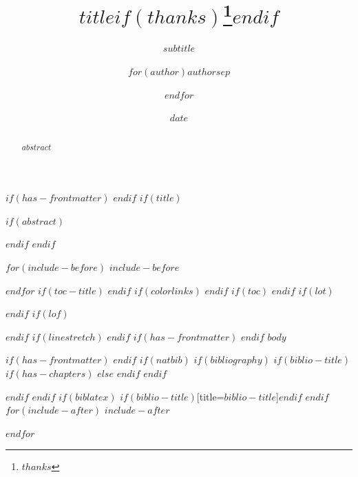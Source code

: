 \documentclass[
a4paper,
]{$documentclass$}
\title{$title$$if(thanks)$\thanks{$thanks$}$endif$}
\subtitle{$subtitle$}
\author{$for(author)$$author$$sep$ \and $endfor$}
\date{$date$}
\begin{document}
$if(has-frontmatter)$
\frontmatter
$endif$
$if(title)$
\maketitle
$if(abstract)$
\begin{abstract}
$abstract$
\end{abstract}
$endif$
$endif$
\layout

$for(include-before)$
$include-before$

$endfor$
$if(toc-title)$
\renewcommand*\contentsname{%
    $toc-title$%
    $if(toc-subtitle)$
    \newline\textmd{\small{$toc-subtitle$}}%
    $endif$%
}
$endif$
$if(colorlinks)$
\hypersetup{linkcolor=$if(toccolor)$$toccolor$$else$$endif$}
$endif$
$if(toc)$
{
\setcounter{tocdepth}{$toc-depth$}
\tableofcontents
}
$endif$
$if(lot)$
\listoftables
$endif$
$if(lof)$
\listoffigures
$endif$
$if(linestretch)$
$endif$
$if(has-frontmatter)$
\mainmatter
$endif$
$body$

$if(has-frontmatter)$
\backmatter
$endif$
$if(natbib)$
$if(bibliography)$
$if(biblio-title)$
$if(has-chapters)$
\renewcommand\bibname{$biblio-title$}
$else$
\renewcommand\refname{$biblio-title$}
$endif$
$endif$
  

$endif$
$endif$
$if(biblatex)$
\printbibliography$if(biblio-title)$[title=$biblio-title$]$endif$
$endif$
$for(include-after)$
$include-after$

$endfor$
\end{document}
